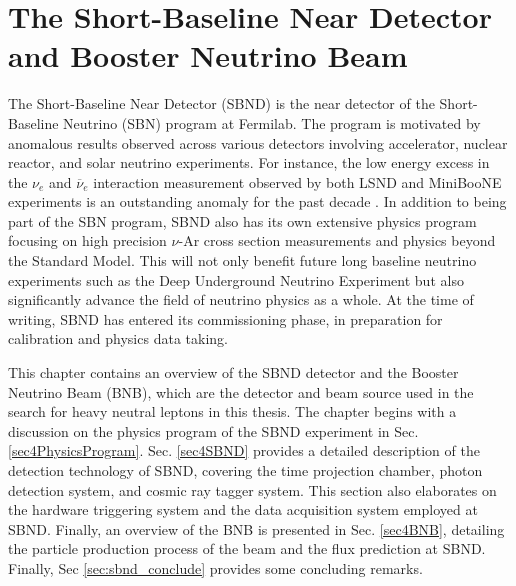 \chapter{The Short-Baseline Near Detector and Booster Neutrino Beam}
\label{ChapterDetector}
\ifpdf
    \graphicspath{{Chapter4/Figs/Raster/}{Chapter4/Figs/PDF/}{Chapter4/Figs/}}
\else
    \graphicspath{{Chapter4/Figs/Vector/}{Chapter4/Figs/}}
\fi


The Short-Baseline Near Detector (SBND) is the near detector of the Short-Baseline Neutrino (SBN) program at Fermilab.
The program is motivated by anomalous results observed across various detectors involving accelerator, nuclear reactor, and solar neutrino experiments.
For instance, the low energy excess in the $\nu_e$ and $\overline{\nu}_e$ interaction measurement observed by both LSND and MiniBooNE experiments is an outstanding anomaly for the past decade \cite{LSND_anomaly, Miniboone_anomaly}.
In addition to being part of the SBN program, SBND also has its own extensive physics program focusing on high precision $\nu$-Ar cross section measurements and physics beyond the Standard Model. 
This will not only benefit future long baseline neutrino experiments such as the Deep Underground Neutrino Experiment but also significantly advance the field of neutrino physics as a whole.
At the time of writing, SBND has entered its commissioning phase, in preparation for calibration and physics data taking.

This chapter contains an overview of the SBND detector and the Booster Neutrino Beam (BNB), which are the detector and beam source used in the search for heavy neutral leptons in this thesis.
The chapter begins with a discussion on the physics program of the SBND experiment in Sec. \ref{sec4PhysicsProgram}. 
Sec. \ref{sec4SBND} provides a detailed description of the detection technology of SBND, covering the time projection chamber, photon detection system, and cosmic ray tagger system. 
This section also elaborates on the hardware triggering system and the data acquisition system employed at SBND.
Finally, an overview of the BNB is presented in Sec. \ref{sec4BNB}, detailing the particle production process of the beam and the flux prediction at SBND.
Finally, Sec \ref{sec:sbnd_conclude} provides some concluding remarks.  

